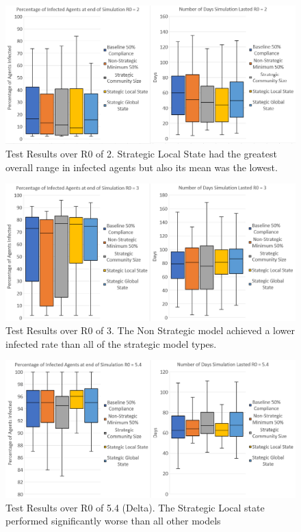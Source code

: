 \documentclass{article}
\begin{document}
\newpage

\begin{figure}[h!]
\centering
\includegraphics[width=\textwidth]{5}
\caption{Test Results over R0 of 2. Strategic Local State had the greatest overall range in infected agents but also its mean was the lowest.}
\end{figure}

\begin{figure}[h!]
\centering
\includegraphics[width=\textwidth]{4}
\caption{Test Results over R0 of 3. The Non Strategic model achieved a lower infected rate than all of the strategic model types.}
\end{figure}

\newpage

\begin{figure}[h!]
\centering
\includegraphics[width=\textwidth]{3}
\caption{Test Results over R0 of 5.4 (Delta). The Strategic Local state performed significantly worse than all other models}
\end{figure}
\end{document}

